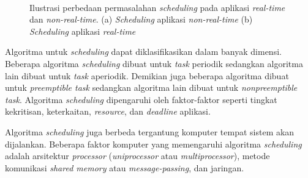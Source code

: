 \begin{figure}[htbp]
    \centering
    \vspace{18pt}
    \\
    \vspace{18pt}\hspace{24pt}
    \caption[Ilustrasi perbedaan permasalahan \textit{scheduling} pada aplikasi \textit{real-time} dan \textit{non-real-time}]{Ilustrasi perbedaan permasalahan \textit{scheduling} pada aplikasi \textit{real-time} dan \textit{non-real-time}. (a) \textit{Scheduling} aplikasi \textit{non-real-time} (b) \textit{Scheduling} aplikasi \textit{real-time}}
    \label{figure:scheduling_comparison}
\end{figure}

Algoritma untuk \textit{scheduling} dapat diklasifikasikan dalam banyak dimensi.  Beberapa
algoritma \textit{scheduling} dibuat untuk \textit{task} periodik sedangkan algoritma lain
dibuat untuk \textit{task} aperiodik.  Demikian juga beberapa algoritma dibuat untuk
\textit{preemptible task} sedangkan algoritma lain dibuat untuk \textit{nonpreemptible task}.
Algoritma \textit{scheduling} dipengaruhi oleh faktor-faktor seperti tingkat kekritisan,
keterkaitan, \textit{resource}, dan \textit{deadline} aplikasi.

Algoritma \textit{scheduling} juga berbeda tergantung komputer tempat sistem akan dijalankan.
Beberapa faktor komputer yang memengaruhi algoritma \textit{scheduling} adalah arsitektur
\textit{processor} (\textit{uniprocessor} atau \textit{multiprocessor}), metode komunikasi
\textit{shared memory} atau \textit{message-passing}, dan jaringan.

